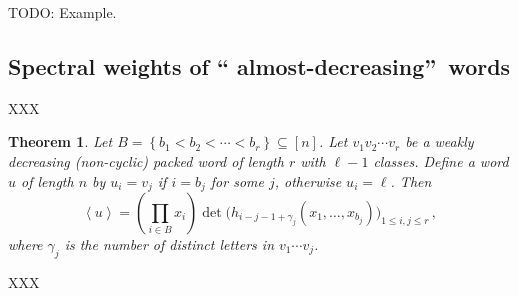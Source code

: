 \documentclass[reqno]{amsart}%
\newcommand{\0}{\phantom{c}}
\let\prodnonlimits\prod
\renewcommand{\prod}{\prodnonlimits\limits}
\theoremstyle{plain}
\newtheorem{thm}{Theorem}[section]
\theoremstyle{definition}
\numberwithin{equation}{section}
\begin{document}
TODO: Example.

\subsection{Spectral weights of \textquotedblleft
almost-decreasing\textquotedblright\ words}

XXX

\begin{thm}
\label{thm:determinant_form} Let $B = \left\{  b_{1} < b_{2} < \cdots< b_{r}
\right\}  \subseteq\left[  n \right]  $. Let $v_{1}v_{2} \dotsm v_{r}$ be a
weakly decreasing (non-cyclic) packed word of length $r$ with $\ell-1$
classes. Define a word $u$ of length $n$ by $u_{i} = v_{j}$ if $i = b_{j}$ for
some $j$, otherwise $u_{i} = \ell$. Then
\[
\left\langle u \right\rangle = \left(  \prod_{i\in B} x_{i} \right)
\det\bigl( h_{i-j-1+\gamma_{j}}(x_{1}, \dotsc, x_{b_{j}}) \bigr)_{1\leq
i,j\leq r}\,,
\]
where $\gamma_{j}$ is the number of distinct letters in $v_{1} \dotsm v_{j}$.
\end{thm}

XXX



{}
\end{document}
